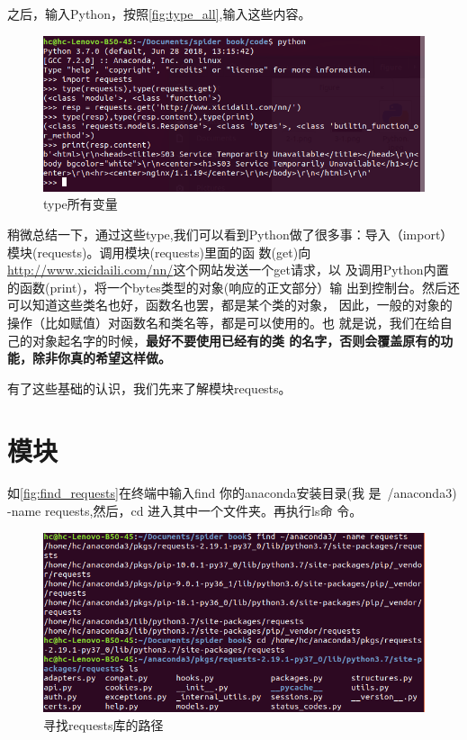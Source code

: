 \documentclass[11pt,UTF8,oneside]{mybook}
\begin{document}
之后，输入Python，按照\autoref{fig:type_all},输入这些内容。
\begin{figure}[htb]
  \centering \includegraphics[width=\textwidth]{./figure/type_all.png}
  \caption{type所有变量}
  \label{fig:type_all}
\end{figure}

稍微总结一下，通过这些type,我们可以看到Python做了很多事：导入（import）
模块(requests)。调用模块(requests)里面的函
数(get)向\url{http://www.xicidaili.com/nn/}这个网站发送一个get请求，以
及调用Python内置的函数(print)，将一个bytes类型的对象(响应的正文部分）输
出到控制台。然后还可以知道这些类名也好，函数名也罢，都是某个类的对象，
因此，一般的对象的操作（比如赋值）对函数名和类名等，都是可以使用的。也
就是说，我们在给自己的对象起名字的时候，\textbf{最好不要使用已经有的类
的名字，否则会覆盖原有的功能，除非你真的希望这样做。}

有了这些基础的认识，我们先来了解模块requests。

\section{模块}
\label{sec:module}


如\autoref{fig:find_requests}在终端中输入find 你的anaconda安装目录(我
是~/anaconda3) -name requests,然后，cd 进入其中一个文件夹。再执行ls命
令。

\begin{figure}[htb]
  \centering
  \includegraphics[width=\textwidth]{./figure/find_requests.png}
  \caption{寻找requests库的路径}
  \label{fig:find_requests}
\end{figure}
\end{document}
